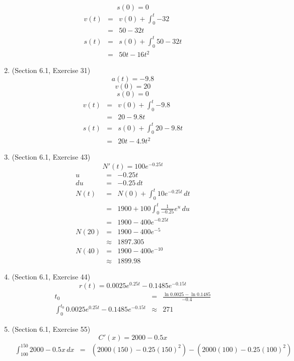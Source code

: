 \documentclass{article}
\begin{document}
\begin{enumerate}
        $$s(0) = 0$$
        \begin{eqnarray}
            v(t) &=& v(0) + \int_0^t{-32} \\
                 &=& 50 - 32t \\
            s(t) &=& s(0) + \int_0^t{50 - 32t} \\
                 &=& 50t - 16t^2
        \end{eqnarray}
    \item (Section 6.1, Exercise 31)
        $$a(t) = -9.8$$
        $$v(0) = 20$$
        $$s(0) = 0$$
        \begin{eqnarray}
            v(t) &=& v(0) + \int_0^t{-9.8} \\
                 &=& 20 - 9.8t \\
            s(t) &=& s(0) + \int_0^t{20 - 9.8t} \\
                 &=& 20t - 4.9t^2
        \end{eqnarray}
    \item (Section 6.1, Exercise 43)
        $$N'(t) = 100e^{-0.25t}$$
        \begin{eqnarray}
            u &=& -0.25t \\
            du &=& -0.25\,dt \\
            N(t) &=& N(0) + \int_0^t{10e^{-0.25t}\,dt} \\
                 &=& 1900 + 100\int_0^t{\frac{1}{-0.25}e^{u}\,du} \\
                 &=& 1900 - 400e^{-0.25t} \\
            N(20) &=& 1900 - 400e^{-5} \\
                  &\approx& 1897.305 \\
            N(40) &=& 1900 - 400e^{-10} \\
                  &\approx& 1899.98
        \end{eqnarray}
    \item (Section 6.1, Exercise 44)
        $$r(t) = 0.0025e^{0.25t} - 0.1485e^{-0.15t}$$
        \begin{eqnarray}
            t_0 &=& \frac{\ln{0.0025} - \ln{0.1485}}{-0.4} \\
            \int_0^{t_0}{0.0025e^{0.25t} - 0.1485e^{-0.15t}} &\approx& 271
        \end{eqnarray}
    \item (Section 6.1, Exercise 55)
        $$C'(x) = 2000 - 0.5x$$
        \begin{eqnarray}
            \int_{100}^{150}{2000 - 0.5x\,dx} &=& \left(2000(150) - 0.25(150)^2\right) - \left(2000(100) - 0.25(100)^2\right) \\

\end{eqnarray}
\end{enumerate}
\end{document}
